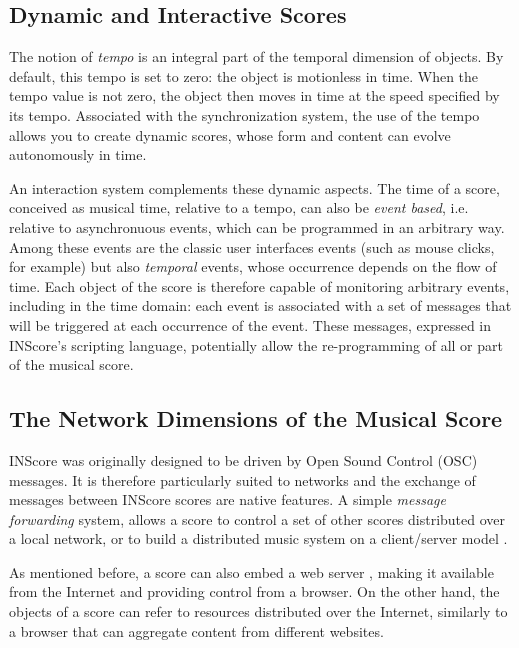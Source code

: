 \documentclass{article}
\begin{document}
\subsection{Dynamic and Interactive Scores}

The notion of \emph{tempo} is an integral part of the temporal dimension of objects. By default, this tempo is set to zero: the object is motionless in time. When the tempo value is not zero, the object then moves in time at the speed specified by its tempo. Associated with the synchronization system, the use of the tempo allows you to create dynamic scores, whose form and content can evolve autonomously in time.

An interaction system complements these dynamic aspects. The time of a score, conceived as musical time, relative to a tempo, can also be \emph{event based}, i.e. relative to asynchronuous events, which can be programmed in an arbitrary way. Among these events are the classic user interfaces events (such as mouse clicks, for example) but also \emph{temporal} events, whose occurrence depends on the flow of time. Each object of the score is therefore capable of monitoring arbitrary events, including in the time domain: each event is associated with a set of messages that will be triggered at each occurrence of the event. These messages, expressed in INScore's scripting language, potentially allow the re-programming of all or part of the musical score.

\subsection{The Network Dimensions of the Musical Score}

INScore was originally designed to be driven by Open Sound Control (OSC) messages. It is therefore particularly suited to networks and the exchange of messages between INScore scores are native features. A simple \emph{message forwarding} system, allows a score to control a set of other scores distributed over a local network, or to build a distributed music system on a client/server model \cite{slavko_zagorac_2018_1289685}.

As mentioned before, a score can also embed a web server \cite{fober:hal-01348511}, making it available from the Internet and providing control from a browser. On the other hand, the objects of a score can refer to resources distributed over the Internet, similarly to a browser that can aggregate content from different websites.
\end{document}
